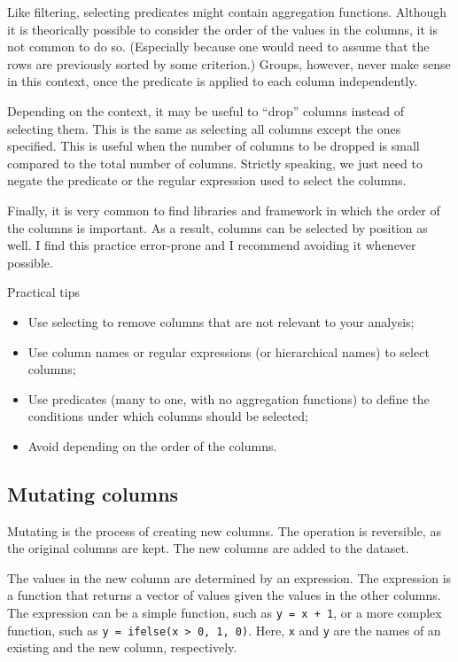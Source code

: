 Like filtering, selecting predicates might contain aggregation functions.  Although it is
theorically possible to consider the order of the values in the columns, it is not common
to do so.  (Especially because one would need to assume that the rows are previously
sorted by some criterion.) Groups, however, never make sense in this context, once the
predicate is applied to each column independently.

Depending on the context, it may be useful to ``drop'' columns instead of selecting them.
This is the same as selecting all columns except the ones specified.  This is useful when
the number of columns to be dropped is small compared to the total number of columns.
Strictly speaking, we just need to negate the predicate or the regular expression used to
select the columns.

Finally, it is very common to find libraries and framework in which the order of the
columns is important.  As a result, columns can be selected by position as well.
I find this practice error-prone and I recommend avoiding it whenever possible.

\begin{mainbox}{Practical tips}
  \begin{itemize}
    \item Use selecting to remove columns that are not relevant to your analysis;
    \item Use column names or regular expressions (or hierarchical names) to select columns;
    \item Use predicates (many to one, with no aggregation functions) to define the conditions
      under which columns should be selected;
    \item Avoid depending on the order of the columns.
  \end{itemize}
\end{mainbox}

\subsection{Mutating columns}

Mutating is the process of creating new columns.  The operation is reversible, as the
original columns are kept.  The new columns are added to the dataset.

The values in the new column are determined by an expression.  The expression is a
function that returns a vector of values given the values in the other columns.  The
expression can be a simple function, such as \texttt{y = x + 1}, or a more complex
function, such as \texttt{y = ifelse(x > 0, 1, 0)}.  Here, \texttt{x} and \texttt{y} are
the names of an existing and the new column, respectively.

